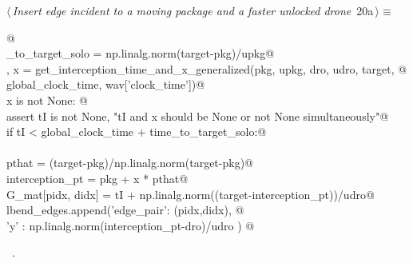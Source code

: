 \documentclass[10pt, english, oneside]{report}
\begin{document}
\begin{flushleft} \small
\begin{minipage}{\linewidth}\label{scrap19}\raggedright\small
{} $\langle\,${\itshape Insert edge incident to a moving package and a faster unlocked drone}\nobreak\ {\footnotesize {20a}}$\,\rangle\equiv$
\vspace{-1ex}
\begin{list}{}{} \item
\mbox{}\verb@   @\\
\mbox{}\verb@time_to_target_solo = np.linalg.norm(target-pkg)/upkg@\\
\mbox{}\verb@tI, x  = get_interception_time_and_x_generalized(pkg, upkg, dro, udro, target, @\\
\mbox{}\verb@                                                global_clock_time, wav['clock_time'])@\\
\mbox{}\verb@if x is not None: @\\
\mbox{}\verb@   assert tI is not None, "tI and x should be None or not None simultaneously"@\\
\mbox{}\verb@   if tI < global_clock_time + time_to_target_solo:@\\
\mbox{}\verb@@\\
\mbox{}\verb@     pthat             = (target-pkg)/np.linalg.norm(target-pkg)@\\
\mbox{}\verb@     interception_pt   = pkg + x * pthat@\\
\mbox{}\verb@     G_mat[pidx, didx] = tI + np.linalg.norm((target-interception_pt))/udro@\\
\mbox{}\verb@     lbend_edges.append({'edge_pair': (pidx,didx), @\\
\mbox{}\verb@                                               'y'       : np.linalg.norm(interception_pt-dro)/udro }) @\\
\mbox{}\verb@@{\NWsep}
\end{list}
\vspace{-1.5ex}
\footnotesize
\begin{list}{}{\setlength{\itemsep}{-\parsep}\setlength{\itemindent}{-\leftmargin}}
\item \NWtxtMacroRefIn\ .

\item{}
\end{list}
\end{minipage}\vspace{4ex}
\end{flushleft}
\end{document}
